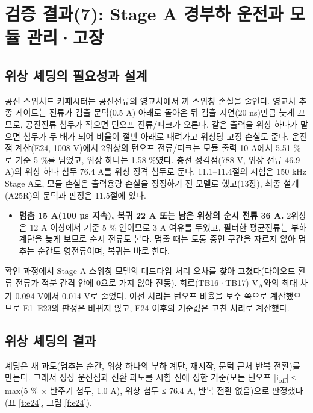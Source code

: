 \chapter{검증 결과(7): Stage A 경부하 운전과 모듈 관리·고장}

\section{위상 셰딩의 필요성과 설계}

공진 스위치드 커패시터는 공진전류의 영교차에서 꺼 스위칭 손실을 줄인다\cite{b22}. 영교차 추종 게이트는 전류가 검출 문턱(0.5 A) 아래로 돌아온 뒤 검출 지연(20 ns)만큼 늦게 끄므로, 공진전류 첨두가 작으면 턴오프 전류/피크가 오른다. 같은 출력을 위상 하나가 맡으면 첨두가 두 배가 되어 비율이 절반 아래로 내려가고 위상당 고정 손실도 준다\cite{b23}. 운전점 계산(E24, 1008 V)에서 2위상의 턴오프 전류/피크는 모듈 출력 10 A에서 5.51 \%로 기준 5 \%를 넘었고, 위상 하나는 1.58 \%였다. 충전 정격점(788 V, 위상 전류 46.9 A)의 위상 하나 첨두 76.4 A를 위상 정격 첨두로 둔다. 11.1–11.4절의 시험은 150 kHz Stage A로, 모듈 손실은 출력용량 손실을 정정하기 전 모델로 했고(13장), 최종 설계(A25R)의 문턱과 판정은 11.5절에 있다.


\begin{itemize}
\item \textbf{멈춤 15 A(100 µs 지속), 복귀 22 A 또는 남은 위상의 순시 전류 36 A.} 2위상은 12 A 이상에서 기준 5 \% 안이므로 3 A 여유를 두었고, 필터한 평균전류는 부하 계단을 늦게 보므로 순시 전류도 본다. 멈출 때는 도통 중인 구간을 자르지 않아 멈추는 순간도 영전류이며, 복귀는 바로 한다.
\end{itemize}

확인 과정에서 Stage A 스위칭 모델의 데드타임 처리 오차를 찾아 고쳤다(다이오드 환류 전류가 적분 간격 안에 0으로 가지 않아 진동). 회로(TB16·TB17) V\textsubscript{A}와의 최대 차가 0.094 V에서 0.014 V로 줄었다. 이전 처리는 턴오프 비율을 보수 쪽으로 계산했으므로 E1–E23의 판정은 바뀌지 않고, E24 이후의 기준값은 고친 처리로 계산했다.

\section{위상 셰딩의 결과}

셰딩은 새 과도(멈추는 순간, 위상 하나의 부하 계단, 재시작, 문턱 근처 반복 전환)를 만든다. 그래서 정상 운전점과 전환 과도를 시험 전에 정한 기준(모든 턴오프 |i\textsubscript{off}| ≤ max(5 \% × 반주기 첨두, 1.0 A), 위상 첨두 ≤ 76.4 A, 반복 전환 없음)으로 판정했다(표 \ref{t:e24}, 그림 \ref{f:e24}).

